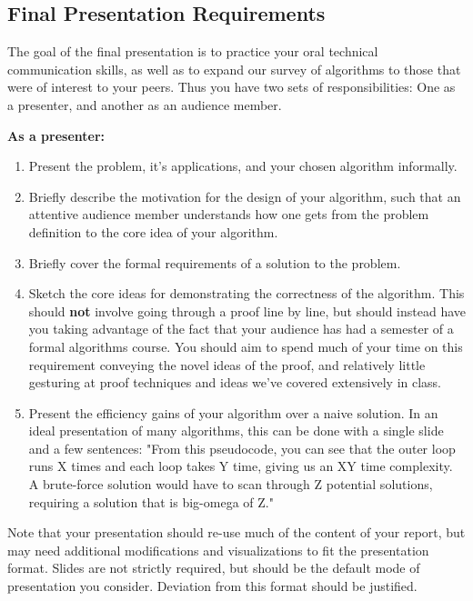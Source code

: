 \documentclass{article}
\begin{document}
\subsection{Final Presentation Requirements}

The goal of the final presentation is to practice your oral technical communication skills, as well as to expand our survey of algorithms to those that were of interest to your peers. Thus you have two sets of responsibilities: One as a presenter, and another as an audience member.

\textbf{As a presenter:}
\begin{enumerate}
    \item Present the problem, it's applications, and your chosen algorithm informally.
    \item Briefly describe the motivation for the design of your algorithm, such that an attentive audience member understands how one gets from the problem definition to the core idea of your algorithm.
    \item Briefly cover the formal requirements of a solution to the problem.
    \item Sketch the core ideas for demonstrating the correctness of the algorithm. This should \textbf{not} involve going through a proof line by line, but should instead have you taking advantage of the fact that your audience has had a semester of a formal algorithms course. You should aim to spend much of your time on this requirement conveying the novel ideas of the proof, and relatively little gesturing at proof techniques and ideas we've covered extensively in class.
    \item Present the efficiency gains of your algorithm over a naive solution. In an ideal presentation of many algorithms, this can be done with a single slide and a few sentences: "From this pseudocode, you can see that the outer loop runs X times and each loop takes Y time, giving us an XY time complexity. A brute-force solution would have to scan through Z potential solutions, requiring a solution that is big-omega of Z." 
\end{enumerate}

Note that your presentation should re-use much of the content of your report, but may need additional modifications and visualizations to fit the presentation format. Slides are not strictly required, but should be the default mode of presentation you consider. Deviation from this format should be justified. 
\end{document}
